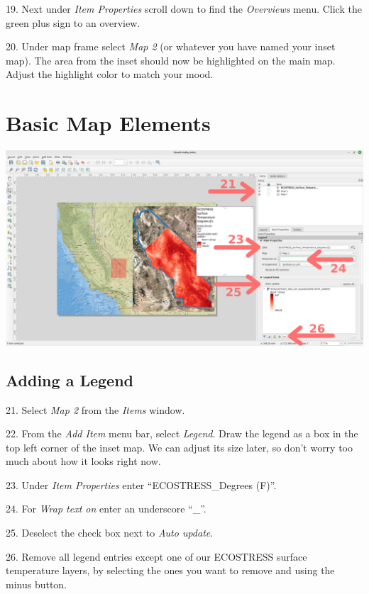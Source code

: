 \documentclass[oneside,a4paper,11pt,explicit]{book}
\begin{document}
19. Next under \textit{Item Properties} scroll down to find the \textit{Overviews} menu. Click the green plus sign to an overview.

20. Under map frame select \textit{Map 2} (or whatever you have named your inset map). The area from the inset should now be highlighted on the main map. Adjust the highlight color to match your mood.

\section{Basic Map Elements}

\centerline{\includegraphics[width=\textwidth]{TempLegend1.png}}

\subsection{Adding a Legend}

21. Select \textit{Map 2} from the \textit{Items} window.

22. From the \textit{Add Item} menu bar, select \textit{Legend}. Draw the legend as a box in the top left corner of the inset map. We can adjust its size later, so don't worry too much about how it looks right now.

23. Under \textit{Item Properties} enter ``ECOSTRESS\_Degrees (F)''.

24. For \textit{Wrap text on} enter an underscore ``\_''.

25. Deselect the check box next to \textit{Auto update}.

26. Remove all legend entries except one of our ECOSTRESS surface temperature layers, by selecting the ones you want to remove and using the minus button. 

\end{document}
